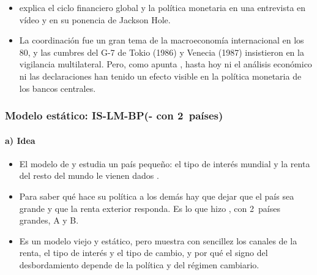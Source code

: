 \documentclass[11pt]{article}
\begin{document}
\begin{anotaciones}
\begin{itemize}
\item {} explica el ciclo financiero global y la política monetaria en una entrevista en vídeo\nocite{Rey2013Video} y en su ponencia de Jackson Hole\nocite{Rey2013Dilema}.
\item La coordinación fue un gran tema de la macroeconomía internacional en los 80\nocite{BuiterMarston1985,BryantPortes1987}, y las cumbres del G-7 de Tokio (1986) y Venecia (1987) insistieron en la vigilancia multilateral. Pero, como apunta \textcite[nota~17]{Rey2013Dilema}, hasta hoy ni el análisis económico ni las declaraciones han tenido un efecto visible en la política monetaria de los bancos centrales.
\end{itemize}
\end{anotaciones}

\subsubsection{Modelo estático: IS-LM-BP\cortetitulo (- con 2~países)}\label{sec:mundell-fleming-2}

\paragraph{a) Idea}
\begin{itemize}
\item El modelo de \textcite{Fleming1962Domestic} y \textcite{Mundell1963Capital} estudia un país pequeño: el tipo de interés mundial y la renta del resto del mundo le vienen dados .
\item Para saber qué hace su política a los demás hay que dejar que el país sea grande y que la renta exterior responda. Es lo que hizo \textcite{Mundell1964Reply}, con 2~países grandes, A y B.
\item Es un modelo viejo y estático, pero muestra con sencillez los canales de la renta, el tipo de interés y el tipo de cambio, y por qué el signo del desbordamiento depende de la política y del régimen cambiario.
\end{itemize}
\end{document}
